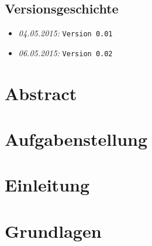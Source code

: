 \documentclass{fhnwreport/fhnwreport}
\begin{document}


\tableofcontents
\vspace{80mm}
\subsection*{Versionsgeschichte}
\begin{itemize}
    \item[]
        \emph{04.05.2015:} \texttt{Version 0.01}
    \item[]
        \emph{06.05.2015:} \texttt{Version 0.02}
\end{itemize}
\clearpage

\section*{Abstract}
\label{sec:abstract}



\clearpage
\section*{Aufgabenstellung}
\label{sec:aufgabenstellung}



\clearpage
\section*{Einleitung}
\label{sec:einleitung}



\clearpage
\section*{Grundlagen}
\label{sec:grundlagen}



\clearpage
\end{document}
